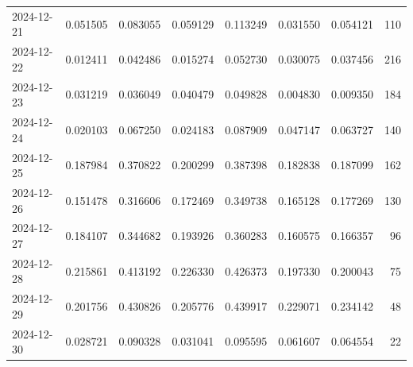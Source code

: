 \begin{tabular}{lrrrrrrr}
2024-12-21 & 0.051505 & 0.083055 & 0.059129 & 0.113249 & 0.031550 & 0.054121 & 110 \\
2024-12-22 & 0.012411 & 0.042486 & 0.015274 & 0.052730 & 0.030075 & 0.037456 & 216 \\
2024-12-23 & 0.031219 & 0.036049 & 0.040479 & 0.049828 & 0.004830 & 0.009350 & 184 \\
2024-12-24 & 0.020103 & 0.067250 & 0.024183 & 0.087909 & 0.047147 & 0.063727 & 140 \\
2024-12-25 & 0.187984 & 0.370822 & 0.200299 & 0.387398 & 0.182838 & 0.187099 & 162 \\
2024-12-26 & 0.151478 & 0.316606 & 0.172469 & 0.349738 & 0.165128 & 0.177269 & 130 \\
2024-12-27 & 0.184107 & 0.344682 & 0.193926 & 0.360283 & 0.160575 & 0.166357 & 96 \\
2024-12-28 & 0.215861 & 0.413192 & 0.226330 & 0.426373 & 0.197330 & 0.200043 & 75 \\
2024-12-29 & 0.201756 & 0.430826 & 0.205776 & 0.439917 & 0.229071 & 0.234142 & 48 \\
2024-12-30 & 0.028721 & 0.090328 & 0.031041 & 0.095595 & 0.061607 & 0.064554 & 22 \\
\bottomrule
\end{tabular}
